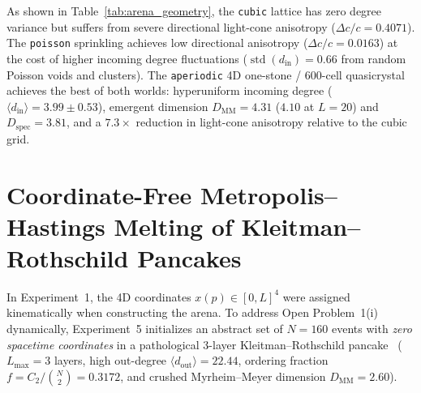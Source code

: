 \documentclass[11pt,a4paper]{article}
\theoremstyle{definition}
\theoremstyle{remark}
\begin{document}
As shown in Table~\ref{tab:arena_geometry}, the \texttt{cubic} lattice has zero degree variance but suffers from severe directional light-cone anisotropy ($\Delta c / c = 0.4071$). The \texttt{poisson} sprinkling achieves low directional anisotropy ($\Delta c / c = 0.0163$) at the cost of higher incoming degree fluctuations ($\operatorname{std}(d_{\mathrm{in}}) = 0.66$ from random Poisson voids and clusters). The \texttt{aperiodic} 4D one-stone / $600$-cell quasicrystal achieves the best of both worlds: hyperuniform incoming degree ($\langle d_{\mathrm{in}}\rangle = 3.99 \pm 0.53$), emergent dimension $D_{\mathrm{MM}} = 4.31$ ($4.10$ at $L = 20$) and $D_{\mathrm{spec}} = 3.81$, and a $7.3\times$ reduction in light-cone anisotropy relative to the cubic grid.

\section{Coordinate-Free Metropolis--Hastings Melting of Kleitman--Rothschild Pancakes}
\label{sec:mcmc}

In Experiment~1, the 4D coordinates $x(p) \in [0, L]^4$ were assigned kinematically when constructing the arena. To address Open Problem~1(i) dynamically, Experiment~5 initializes an abstract set of $N = 160$ events with \emph{zero spacetime coordinates} in a pathological 3-layer Kleitman--Rothschild pancake~\cite{KleitmanRothschild1975} ($L_{\max} = 3$ layers, high out-degree $\langle d_{\mathrm{out}}\rangle = 22.44$, ordering fraction $f = C_2 / \binom{N}{2} = 0.3172$, and crushed Myrheim--Meyer dimension $D_{\mathrm{MM}} = 2.60$).
\end{document}
